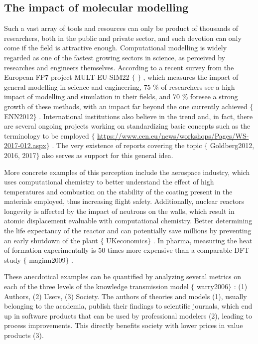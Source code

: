 \subsection{The impact of molecular modelling }
Such a vast array of tools and resources can only be product of thousands of researchers, both in the public and private sector, and such devotion can only come if the field is attractive enough. Computational modelling is widely regarded as one of the fastest growing sectors in science, as perceived by researches and engineers themselves. According to a recent survey from the European FP7 project MULT-EU-SIM22 $ \{ $ $ \} $ , which measures the impact of general modelling in science and engineering, 75 $\%$  of researchers see a high impact of modelling and simulation in their fields, and 70 $\%$  foresee a strong growth of these methods, with an impact far beyond the one currently achieved $ \{ $ ENN2012$ \} $ . International institutions also believe in the trend and, in fact, there are several ongoing projects working on standardizing basic concepts such as the terminology to be employed $ \{ $ \href{https://www.cen.eu/news/workshops/Pages/WS-2017-012.aspx}{https://www.cen.eu/news/workshops/Pages/WS-2017-012.aspx}$ \} $ . The very existence of reports covering the topic $ \{ $ Goldberg2012, 2016, 2017$ \} $  also serves as support for this general idea.

More concrete examples of this perception include the aerospace industry, which uses computational chemistry to better understand the effect of high temperatures and combustion on the stability of the coating present in the materials employed, thus increasing flight safety. Additionally, nuclear reactors longevity is affected by the impact of neutrons on the walls, which result in atomic displacement evaluable with computational chemistry. Better determining the life expectancy of the reactor and can potentially save millions by preventing an early shutdown of the plant $ \{ $ UKeconomics$ \} $ . In pharma, measuring the heat of formation experimentally is 50 times more expensive than a comparable DFT study $ \{ $ maginn2009$ \} $ .

These anecdotical examples can be quantified by analyzing several metrics on each of the three levels of the knowledge transmission model $ \{ $ warry2006$ \} $ : (1) Authors, (2) Users, (3) Society. The authors of theories and models (1), usually belonging to the academia, publish their findings to scientific journals, which end up in software products that can be used by professional modelers (2), leading to process improvements. This directly benefits society with lower prices in value products (3).

